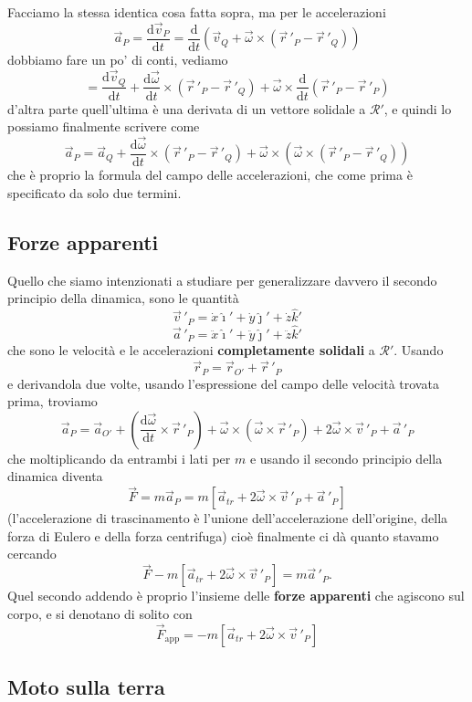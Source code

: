 \documentclass[11pt]{scrartcl}
\newcommand{\dif}{\text{d}}
\newcommand{\ihat}{\hat{\imath}}
\newcommand{\jhat}{\hat{\jmath}}
\newcommand{\khat}{\hat{k}}
\begin{document}
	Facciamo la stessa identica cosa fatta sopra, ma per le accelerazioni
	$$\vec{a}_P=\frac{\dif \vec{v}_P}{\dif t}=\frac{\dif}{\dif t}\left(\vec{v}_Q+\vec{\omega}\times\left(\vec{r}\,'_P-\vec{r}\,'_Q\right)\right)$$
	dobbiamo fare un po' di conti, vediamo
	$$=\frac{\dif \vec{v}_Q}{\dif t}+\frac{\dif \vec{\omega}}{\dif t}\times \left(\vec{r}\,'_P-\vec{r}\,'_Q\right)+ \vec{\omega}\times \frac{\dif}{\dif t}\left(\vec{r}\,'_P-\vec{r}\,'_P\right)$$
	d'altra parte quell'ultima è una derivata di un vettore solidale a $\mathcal{R}'$, e quindi lo possiamo finalmente scrivere come
	$$\vec{a}_P=\vec{a}_Q+\frac{\dif \vec{\omega}}{\dif t}\times \left(\vec{r}\,'_P-\vec{r}\,'_Q\right)+\vec{\omega}\times\left(\vec{\omega}\times\left(\vec{r}\,'_P-\vec{r}\,'_Q\right) \right)$$
	che è proprio la formula del campo delle accelerazioni, che come prima è specificato da solo due termini.
	
	\subsection{Forze apparenti}
	
	Quello che siamo intenzionati a studiare per generalizzare davvero il secondo principio della dinamica, sono le quantità
	$$\vec{v}\,'_P=\dot{x}\ihat'+\dot{y}\jhat'+\dot{z}\khat'$$
	$$\vec{a}\,'_P=\ddot{x}\ihat'+\ddot{y}\jhat'+\ddot{z}\khat'$$
	che sono le velocità e le accelerazioni \textbf{completamente solidali} a $\mathcal{R}'$. Usando
	$$\vec{r}_P=\vec{r}_{O'}+\vec{r}\,'_P$$
	e derivandola due volte, usando l'espressione del campo delle velocità trovata prima, troviamo
	$$\vec{a}_P=\vec{a}_{O'}+\left(\frac{\dif \vec{\omega}}{\dif t}\times \vec{r}\,'_P\right)+\vec{\omega}\times\left(\vec{\omega}\times \vec{r}\,'_P\right)+2\vec{\omega}\times\vec{v}\,'_P+\vec{a}\,'_P$$
	che moltiplicando da entrambi i lati per $m$ e usando il secondo principio della dinamica diventa
	$$\vec{F}=m\vec{a}_P=m\left[\vec{a}_{tr}+2\vec{\omega}\times \vec{v}\,'_P+\vec{a}\,'_P\right]$$
	(l'accelerazione di trascinamento è l'unione dell'accelerazione dell'origine, della forza di Eulero e della forza centrifuga) cioè finalmente ci dà quanto stavamo cercando
	$$\vec{F}-m\left[\vec{a}_{tr}+2\vec{\omega}\times \vec{v}\,'_P\right]=m\vec{a}\,'_P.$$
	Quel secondo addendo è proprio l'insieme delle \textbf{forze apparenti} che agiscono sul corpo, e si denotano di solito con 
	$$\vec{F}_\text{app}=-m\left[\vec{a}_{tr}+2\vec{\omega}\times \vec{v}\,'_P\right]$$
	
	\subsection{Moto sulla terra} 
	
\end{document}
